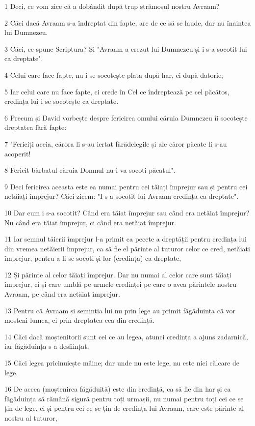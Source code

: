 \par 1 Deci, ce vom zice că a dobândit după trup strămoșul nostru Avraam?
\par 2 Căci dacă Avraam s-a îndreptat din fapte, are de ce să se laude, dar nu înaintea lui Dumnezeu.
\par 3 Căci, ce spune Scriptura? Și "Avraam a crezut lui Dumnezeu și i s-a socotit lui ca dreptate".
\par 4 Celui care face fapte, nu i se socotește plata după har, ci după datorie;
\par 5 Iar celui care nu face fapte, ci crede în Cel ce îndreptează pe cel păcătos, credința lui i se socotește ca dreptate.
\par 6 Precum și David vorbește despre fericirea omului căruia Dumnezeu îi socotește dreptatea fără fapte:
\par 7 "Fericiți aceia, cărora li s-au iertat fărădelegile și ale căror păcate li s-au acoperit!
\par 8 Fericit bărbatul căruia Domnul nu-i va socoti păcatul".
\par 9 Deci fericirea aceasta este ea numai pentru cei tăiați împrejur sau și pentru cei netăiați împrejur? Căci zicem: "I s-a socotit lui Avraam credința ca dreptate".
\par 10 Dar cum i s-a socotit? Când era tăiat împrejur sau când era netăiat împrejur? Nu când era tăiat împrejur, ci când era netăiat împrejur.
\par 11 Iar semnul tăierii împrejur l-a primit ca pecete a dreptății pentru credința lui din vremea netăierii împrejur, ca să fie el părinte al tuturor celor ce cred, netăiați împrejur, pentru a li se socoti și lor (credința) ca dreptate,
\par 12 Și părinte al celor tăiați împrejur. Dar nu numai al celor care sunt tăiați împrejur, ci și care umblă pe urmele credinței pe care o avea părintele nostru Avraam, pe când era netăiat împrejur.
\par 13 Pentru că Avraam și seminția lui nu prin lege au primit făgăduința că vor moșteni lumea, ci prin dreptatea cea din credință.
\par 14 Căci dacă moștenitorii sunt cei ce au legea, atunci credința a ajuns zadarnică, iar făgăduința s-a desființat,
\par 15 Căci legea pricinuiește mâine; dar unde nu este lege, nu este nici călcare de lege.
\par 16 De aceea (moștenirea făgăduită) este din credință, ca să fie din har și ca făgăduința să rămână sigură pentru toți urmașii, nu numai pentru toți cei ce se țin de lege, ci și pentru cei ce se țin de credința lui Avraam, care este părinte al nostru al tuturor,
